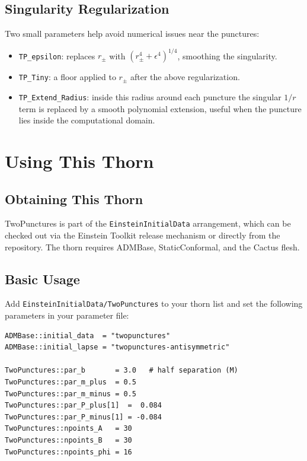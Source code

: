 \subsection{Singularity Regularization}

Two small parameters help avoid numerical issues near the punctures:
\begin{itemize}
  \item \texttt{TP\_epsilon}: replaces $r_\pm$ with
    $(r_\pm^4 + \epsilon^4)^{1/4}$, smoothing the singularity.
  \item \texttt{TP\_Tiny}: a floor applied to $r_\pm$ after the above
    regularization.
  \item \texttt{TP\_Extend\_Radius}: inside this radius around each puncture
    the singular $1/r$ term is replaced by a smooth polynomial extension,
    useful when the puncture lies inside the computational domain.
\end{itemize}

\section{Using This Thorn}

\subsection{Obtaining This Thorn}

TwoPunctures is part of the \texttt{EinsteinInitialData} arrangement, which
can be checked out via the Einstein Toolkit release mechanism or directly from
the repository.  The thorn requires ADMBase, StaticConformal, and the
Cactus flesh.

\subsection{Basic Usage}

Add \texttt{EinsteinInitialData/TwoPunctures} to your thorn list and set the
following parameters in your parameter file:

\begin{verbatim}
ADMBase::initial_data  = "twopunctures"
ADMBase::initial_lapse = "twopunctures-antisymmetric"

TwoPunctures::par_b       = 3.0   # half separation (M)
TwoPunctures::par_m_plus  = 0.5
TwoPunctures::par_m_minus = 0.5
TwoPunctures::par_P_plus[1]  =  0.084
TwoPunctures::par_P_minus[1] = -0.084
TwoPunctures::npoints_A   = 30
TwoPunctures::npoints_B   = 30
TwoPunctures::npoints_phi = 16
\end{verbatim}


